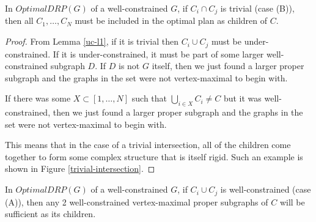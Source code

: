 \documentclass[11pt]{article}
\begin{document}
\begin{theorem}\label{uc-t1}

In $OptimalDRP(G)$ of a well-constrained $G$, if $C_i \cap C_j$ is trivial (case (B)), then all $C_1,\ldots, C_N$ must be included in the optimal plan as children of $C$.
\end{theorem}

\begin{proof}
From Lemma \ref{uc-l1}, if it is trivial then $C_i \cup C_j$ must be under-constrained. If it is under-constrained, it must be part of some larger well-constrained subgraph $D$. If $D$ is not $G$ itself, then we just found a larger proper subgraph and the graphs in the set were not vertex-maximal to begin with.

If there was some $X\subset [1,\ldots,N]$ such that $\bigcup_{i\in X}{C_i}\neq C$ but it was well-constrained, then we just found a larger proper subgraph and the graphs in the set were not vertex-maximal to begin with.

This means that in the case of a trivial intersection, all of the children come together to form some complex structure that is itself rigid. Such an example is shown in Figure \ref{trivial-intersection}.
\end{proof}




\begin{theorem}\label{wc-t1}

In $OptimalDRP(G)$ of a well-constrained $G$, if $C_i \cup C_j$ is well-constrained (case (A)), then any 2 well-constrained vertex-maximal proper subgraphs of $C$ will be sufficient as its children.
\end{theorem}
\end{document}
